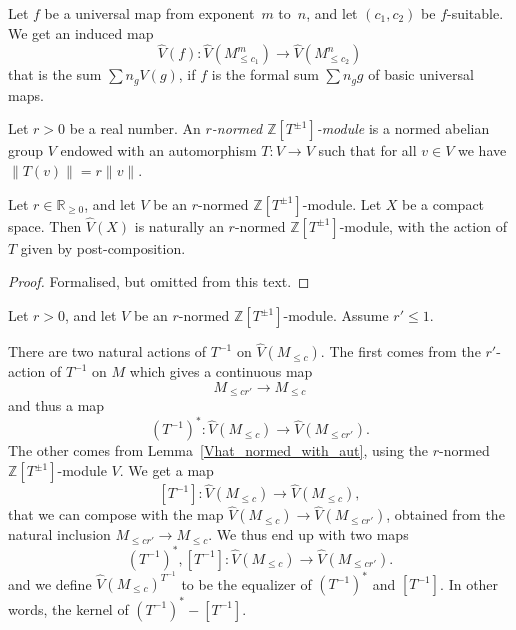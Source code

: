 \begin{definition}
  \label{eval_CLCFP}
  \leanok
  Let $f$ be a universal map from exponent~$m$ to~$n$,
  and let $(c_1, c_2)$ be $f$-suitable.
  We get an induced map
  \[
    \hat V(f) \colon \hat V(M_{\le c_1}^m) \to \hat V(M_{\le c_2}^n)
  \]
  that is the sum $\sum n_g V(g)$,
  if $f$ is the formal sum $\sum n_g g$
  of basic universal maps.
\end{definition}

\begin{definition}
  \label{normed_with_aut}
  \leanok
  Let $r > 0$ be a real number.
  An \emph{$r$-normed $\mathbb Z[T^{\pm 1}]$-module}
  is a normed abelian group $V$
  endowed with an automorphism $T \colon V \to V$ such that
  for all $v \in V$ we have $\|T(v)\| = r\|v\|$.
\end{definition}

\begin{lemma}
  \label{Vhat_normed_with_aut}
  \leanok
  Let $r \in \mathbb R_{\ge 0}$,
  and let $V$ be an $r$-normed $\mathbb Z[T^{\pm 1}]$-module.
  Let $X$ be a compact space.
  Then $\hat V(X)$ is naturally an $r$-normed $\mathbb Z[T^{\pm 1}]$-module,
  with the action of $T$ given by post-composition.
\end{lemma}

\begin{proof}
  \leanok
  Formalised, but omitted from this text.
\end{proof}

Let $r > 0$, and let $V$ be an $r$-normed $\mathbb Z[T^{\pm 1}]$-module.
Assume $r' \le 1$.

\begin{definition}
  \label{CLCFPTinv}
  \leanok
  There are two natural actions of $T^{-1}$ on $\hat V(M_{\le c})$.
  The first comes from the $r'$-action of $T^{-1}$ on $M$
  which gives a continuous map
  \[
    M_{\le cr'} \to M_{\le c}
  \]
  and thus a map
  \[
    (T^{-1})^* \colon \hat V(M_{\le c}) \to \hat V(M_{\le cr'}).
  \]
  The other comes from Lemma~\ref{Vhat_normed_with_aut},
  using the $r$-normed $\mathbb Z[T^{\pm 1}]$-module $V$.
  We get a map
  \[
    [T^{-1}] \colon \hat V(M_{\le c}) \to \hat V(M_{\le c}),
  \]
  that we can compose with the map
  $\hat V(M_{\le c}) \to \hat V(M_{\le cr'})$,
  obtained from the natural inclusion $M_{\le cr'} \to M_{\le c}$.
  We thus end up with two maps
  \[
    (T^{-1})^*, [T^{-1}] \colon \hat V(M_{\le c}) \to \hat V(M_{\le cr'}).
  \]
  and we define $\hat V(M_{\le c})^{T^{-1}}$
  to be the equalizer of $(T^{-1})^*$ and $[T^{-1}]$.
  In other words, the kernel of $(T^{-1})^* - [T^{-1}]$.
\end{definition}

